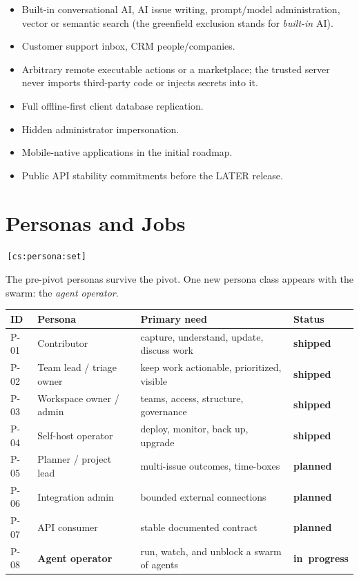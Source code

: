 \documentclass[11pt,a4paper]{report}
\newcommand{\cs}[1]{\,\texttt{\scriptsize[cs:#1]}\label{cs:#1}}
\newcommand{\shipped}{\textbf{\textcolor{green!45!black}{shipped}}}
\newcommand{\inprogress}{\textbf{\textcolor{orange!70!black}{in\ progress}}}
\newcommand{\planned}{\textbf{\textcolor{blue!50!black}{planned}}}
\begin{document}
\begin{itemize}
\item Built-in conversational AI, AI issue writing, prompt/model
  administration, vector or semantic search (the greenfield exclusion
  stands for \emph{built-in} AI).
\item Customer support inbox, CRM people/companies.
\item Arbitrary remote executable actions or a marketplace; the trusted
  server never imports third-party code or injects secrets into it.
\item Full offline-first client database replication.
\item Hidden administrator impersonation.
\item Mobile-native applications in the initial roadmap.
\item Public API stability commitments before the LATER release.
\end{itemize}

\chapter{Personas and Jobs}
\label{ch:personas}

\cs{persona:set}

The pre-pivot personas survive the pivot. One new persona class appears
with the swarm: the \emph{agent operator}.

\begin{center}
\begin{tabular}{@{}lp{}p{}l@{}}
\toprule
\textbf{ID} & \textbf{Persona} & \textbf{Primary need} & \textbf{Status}\\
\midrule
P-01 & Contributor & capture, understand, update, discuss work & \shipped\\
P-02 & Team lead / triage owner & keep work actionable, prioritized, visible & \shipped\\
P-03 & Workspace owner / admin & teams, access, structure, governance & \shipped\\
P-04 & Self-host operator & deploy, monitor, back up, upgrade & \shipped\\
P-05 & Planner / project lead & multi-issue outcomes, time-boxes & \planned\\
P-06 & Integration admin & bounded external connections & \planned\\
P-07 & API consumer & stable documented contract & \planned\\
P-08 & \textbf{Agent operator} & run, watch, and unblock a swarm of agents & \inprogress\\
\bottomrule
\end{tabular}
\end{center}
\end{document}
